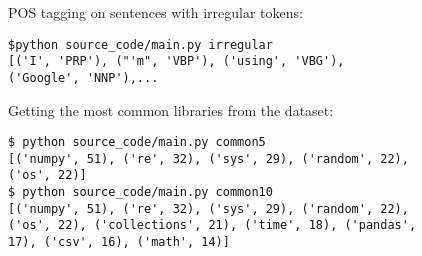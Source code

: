 POS tagging on sentences with irregular tokens:

\begin{lstlisting}
$python source_code/main.py irregular
[('I', 'PRP'), ("'m", 'VBP'), ('using', 'VBG'),
('Google', 'NNP'),...
\end{lstlisting}

Getting the most common libraries from the dataset:

\begin{lstlisting}
$ python source_code/main.py common5
[('numpy', 51), ('re', 32), ('sys', 29), ('random', 22),
('os', 22)]
$ python source_code/main.py common10
[('numpy', 51), ('re', 32), ('sys', 29), ('random', 22),
('os', 22), ('collections', 21), ('time', 18), ('pandas',
17), ('csv', 16), ('math', 14)]
\end{lstlisting}